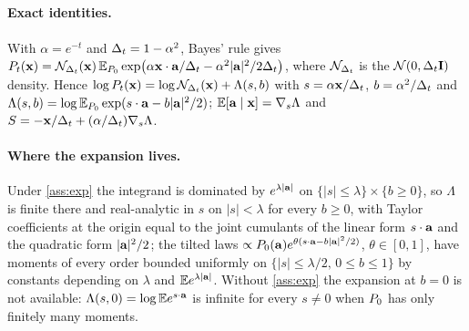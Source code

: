 \subsection{}
\label{app:proof-decay}

\paragraph{Exact identities.}
With $\alpha=e^{-t}$ and $\Delta_t=1-\alpha^2$, Bayes' rule gives
$P_t(\mathbf{x})=\mathcal{N}_{\Delta_t}(\mathbf{x})\,\mathbb{E}_{P_0}\exp\bigl(\alpha\mathbf{x}\cdot\mathbf{a}/\Delta_t-\alpha^2|\mathbf{a}|^2/2\Delta_t\bigr)$,
where $\mathcal{N}_{\Delta_t}$ is the $\mathcal{N}\!\left(0,\Delta_t\mathbf{I}\right)$ density. Hence
$\log P_t(\mathbf{x})=\log\mathcal{N}_{\Delta_t}(\mathbf{x})+\Lambda(s,b)$ with $s=\alpha\mathbf{x}/\Delta_t$, $b=\alpha^2/\Delta_t$
and $\Lambda(s,b)=\log\mathbb{E}_{P_0}\exp(s\cdot\mathbf{a}-b|\mathbf{a}|^2/2)$;
$\mathbb{E}[\mathbf{a}\mid\mathbf{x}]=\nabla_s\Lambda$ and $S=-\mathbf{x}/\Delta_t+(\alpha/\Delta_t)\nabla_s\Lambda$.

\paragraph{Where the expansion lives.}
Under \cref{ass:exp} the integrand is dominated by $e^{\lambda|\mathbf{a}|}$ on
$\{|s|\le\lambda\}\times\{b\ge0\}$, so $\Lambda$ is finite there and real-analytic in $s$
on $|s|<\lambda$ for every $b\ge0$, with Taylor coefficients at the origin equal to the
joint cumulants of the linear form $s\cdot\mathbf{a}$ and the quadratic form $|\mathbf{a}|^2/2$; the
tilted laws $\propto P_0(\mathbf{a})e^{\theta(s\cdot\mathbf{a}-b|\mathbf{a}|^2/2)}$, $\theta\in[0,1]$, have
moments of every order bounded uniformly on $\{|s|\le\lambda/2,\,0\le b\le1\}$ by
constants depending on $\lambda$ and $\mathbb{E} e^{\lambda|\mathbf{a}|}$. Without \cref{ass:exp} the
expansion at $b=0$ is not available: $\Lambda(s,0)=\log\mathbb{E} e^{s\cdot\mathbf{a}}$ is infinite for
every $s\neq0$ when $P_0$ has only finitely many moments.

